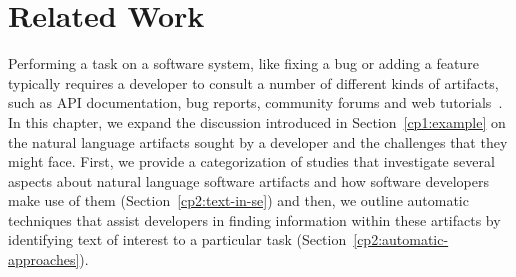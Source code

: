 \setcounter{chapter}{1}


\chapter{Related Work}
\label{ch:related-work}








Performing a task on a software system, like fixing a bug
or adding a feature typically requires a developer to consult
a number of different kinds of artifacts, such
as API documentation, bug reports, community forums
and web tutorials~\cite{umarji2008archetypal,Li2013}. 
In this chapter, 
we expand the discussion introduced in Section~\ref{cp1:example}
on the natural language 
artifacts sought by a developer  
and the challenges that they might face. 
First, we provide 
a categorization of studies that investigate 
several aspects about natural language software artifacts 
and how software developers make use of them (Section~\ref{cp2:text-in-se})
and then, we outline automatic techniques that
assist developers in finding information within these artifacts by 
identifying text of interest 
to a particular task (Section~\ref{cp2:automatic-approaches}).
















